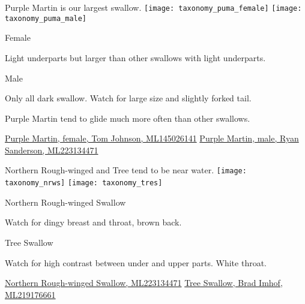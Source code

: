 \documentclass[t]{beamer}
\newcommand{\backoneline}{\vspace{-\baselineskip}}
\begin{document}
%

\begin{frame}{Purple Martin is our largest swallow.}
	\texttt{[image: taxonomy\_puma\_female]}\hfill
	\texttt{[image: taxonomy\_puma\_male]}
	
	\backoneline
	
	\begin{multicols}{2}
		Female
		
		\medskip
		
		Light underparts but larger than other swallows with light underparts.
		
		\columnbreak
		
		Male
		
		\medskip
		
		Only all dark swallow. Watch for large size and slightly forked tail.
	\end{multicols}	
	
	Purple Martin tend to glide much more often than other swallows.
	
	\vfilll
	
	\tiny
	
	\href{https://macaulaylibrary.org/asset/145026141}{Purple Martin, female, Tom Johnson, ML145026141} \hfill 
	\href{https://macaulaylibrary.org/asset/223134471}{Purple Martin, male, Ryan Sanderson, ML223134471}
		
\end{frame}

%

\begin{frame}{Northern Rough-winged and Tree tend to be near water.}
	\texttt{[image: taxonomy\_nrws]}\hfill
	\texttt{[image: taxonomy\_tres]}
	
	\backoneline
	
	\begin{multicols}{2}
		Northern Rough-winged Swallow
		
		\medskip
		
		Watch for dingy breast and throat, brown back.
		
		\columnbreak
		
		Tree Swallow
		
		\medskip
		
		Watch for high contrast between under and upper parts. White throat.
	\end{multicols}	
	
	
	\vfilll
	
	\tiny
	
	\href{https://macaulaylibrary.org/asset/223134471}{Northern Rough-winged Swallow, ML223134471} \hfill 
	\href{https://macaulaylibrary.org/asset/219176661}{Tree Swallow, Brad Imhof, ML219176661}
	
	
\end{frame}
\end{document}
